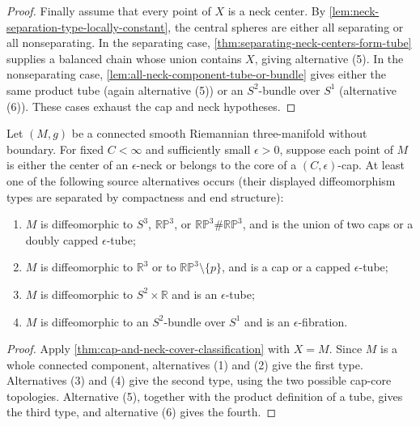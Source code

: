 \begin{proof}
Finally assume that every point of $X$ is a neck center.  By
\ref{lem:neck-separation-type-locally-constant}, the central spheres are
either all separating or all nonseparating.  In the separating case,
\ref{thm:separating-neck-centers-form-tube} supplies a balanced chain whose
union contains $X$, giving alternative (5).  In the nonseparating case,
  \ref{lem:all-neck-component-tube-or-bundle} gives either the same product
  tube (again alternative (5)) or an $S^2$-bundle over $S^1$ (alternative
  (6)).  These cases exhaust the cap and neck hypotheses.
\end{proof}

\begin{theorem}
\label{thm:canonical-neck-cap-topology}
\notready
Let $(M,g)$ be a connected smooth Riemannian three-manifold without boundary.
For fixed
$C<\infty$ and sufficiently small $\epsilon>0$, suppose each point of
$M$ is either the center of an $\epsilon$-neck or belongs to the core of a
$(C,\epsilon)$-cap.  At least one of the following source alternatives
occurs (their displayed diffeomorphism types are separated by compactness
and end structure):
\begin{enumerate}
\item $M$ is diffeomorphic to $S^3$, $\mathbb{RP}^3$, or
      $\mathbb{RP}^3\#\mathbb{RP}^3$, and is the union of two caps or a
      doubly capped $\epsilon$-tube;
\item $M$ is diffeomorphic to $\mathbb R^3$ or to
      $\mathbb{RP}^3\setminus\{p\}$, and is a cap or a capped
      $\epsilon$-tube;
\item $M$ is diffeomorphic to $S^2\times\mathbb R$ and is an
      $\epsilon$-tube;
\item $M$ is diffeomorphic to an $S^2$-bundle over $S^1$ and is an
      $\epsilon$-fibration.
\end{enumerate}
\end{theorem}

\begin{proof}
Apply \ref{thm:cap-and-neck-cover-classification} with $X=M$.  Since $M$
is a whole connected component, alternatives (1) and (2) give the first
type.  Alternatives (3) and (4) give the second type, using the two possible
cap-core topologies.  Alternative (5), together with the product definition
of a tube, gives the third type, and alternative (6) gives the fourth.
\end{proof}

